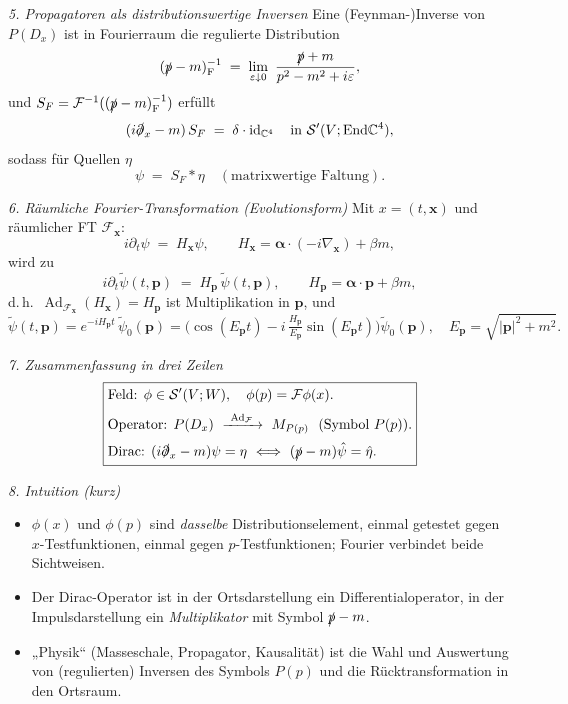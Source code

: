 \documentclass[10pt, letterpaper]{article}
\newcommand{\id}{\operatorname{id}}
\newcommand{\Ad}{\operatorname{Ad}}
\newcommand{\C}{\mathbb{C}}
\newcommand{\End}{\mathrm{End}}
\begin{document}
\emph{5. Propagatoren als distributionswertige Inversen}
Eine (Feynman-)Inverse von $P(D_x)$ ist in Fourierraum die regulierte Distribution
\[
(\slashed{p}-m)^{-1}_{\mathrm{F}}\;=\;\lim_{\varepsilon\downarrow0}\ \frac{\slashed{p}+m}{p^2-m^2+i\varepsilon},
\]
und $S_F=\mathcal{F}^{-1}((\slashed{p}-m)^{-1}_{\mathrm{F}})$ erfüllt
\[
(i\slashed{\partial}_x-m)\,S_F\;=\;\delta\cdot \id_{\C^4}\quad\text{in }\mathcal{S}'(V;\End\C^4),
\]
sodass für Quellen $\eta$
\[
\psi\;=\;S_F * \eta\quad(\text{matrixwertige Faltung}).
\]

\emph{6. Räumliche Fourier-Transformation (Evolutionsform)}
Mit $x=(t,\mathbf{x})$ und räumlicher FT $\mathcal{F}_{\mathbf{x}}$:
\[
i\partial_t \psi\;=\;H_{\mathbf{x}}\psi,\qquad
H_{\mathbf{x}}=\boldsymbol{\alpha}\!\cdot\!(-i\nabla_{\mathbf{x}})+\beta m,
\]
wird zu
\[
i\partial_t \tilde\psi(t,\mathbf{p})\;=\;H_{\mathbf{p}}\,\tilde\psi(t,\mathbf{p}),
\qquad
H_{\mathbf{p}}=\boldsymbol{\alpha}\!\cdot\!\mathbf{p}+\beta m,
\]
d.\,h.\ $\Ad_{\mathcal{F}_{\mathbf{x}}}(H_{\mathbf{x}})=H_{\mathbf{p}}$ ist Multiplikation in $\mathbf{p}$,
und
\[
\tilde\psi(t,\mathbf{p})=
e^{-iH_{\mathbf{p}}t}\,\tilde\psi_0(\mathbf{p})
= \Big(\cos(E_{\mathbf{p}}t)-i\,\tfrac{H_{\mathbf{p}}}{E_{\mathbf{p}}}\sin(E_{\mathbf{p}}t)\Big)\tilde\psi_0(\mathbf{p}),
\quad E_{\mathbf{p}}=\sqrt{|\mathbf{p}|^2+m^2}.
\]

\emph{7. Zusammenfassung in drei Zeilen}
\[
\boxed{
\begin{aligned}
&\text{Feld: } \phi\in\mathcal{S}'(V;W),\quad \phi(p)=\mathcal{F}\phi(x).\\[2pt]
&\text{Operator: } P(D_x)\ \xrightarrow{\ \Ad_{\mathcal{F}}\ }\ M_{P(p)}\ \ (\text{Symbol }P(p)).\\[2pt]
&\text{Dirac: } (i\slashed{\partial}_x-m)\psi=\eta\ \Longleftrightarrow\ (\slashed{p}-m)\hat\psi=\hat\eta.
\end{aligned}}
\]

\emph{8. Intuition (kurz)}
\begin{itemize}
\item $\phi(x)$ und $\phi(p)$ sind \emph{dasselbe} Distributionselement, einmal getestet gegen $x$-Testfunktionen, einmal gegen $p$-Testfunktionen; Fourier verbindet beide Sichtweisen.
\item Der Dirac-Operator ist in der Ortsdarstellung ein Differentialoperator, in der Impulsdarstellung ein \emph{Multiplikator} mit Symbol $\slashed{p}-m$.
\item „Physik“ (Masseschale, Propagator, Kausalität) ist die Wahl und Auswertung von (regulierten) Inversen des Symbols $P(p)$ und die Rücktransformation in den Ortsraum.
\end{itemize}
\end{document}
